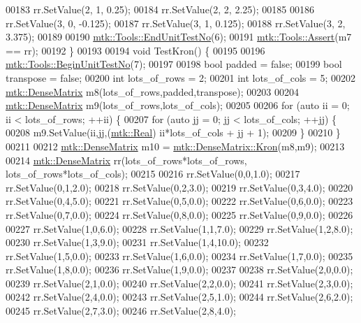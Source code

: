 \begin{DoxyCode}
00183   rr.SetValue(2, 1, 0.25);
00184   rr.SetValue(2, 2, 2.25);
00185 
00186   rr.SetValue(3, 0, -0.125);
00187   rr.SetValue(3, 1, 0.125);
00188   rr.SetValue(3, 2, 3.375);
00189 
00190   \hyperlink{classmtk_1_1Tools_ad8cf0085133dd40c913fe195bc5b9694}{mtk::Tools::EndUnitTestNo}(6);
00191   \hyperlink{classmtk_1_1Tools_aa311fada9255627d06c56b1e4fedce9e}{mtk::Tools::Assert}(m7 == rr);
00192 \}
00193 
00194 \textcolor{keywordtype}{void} TestKron() \{
00195 
00196   \hyperlink{classmtk_1_1Tools_a26ee906d28523378522a75e25c3a4e19}{mtk::Tools::BeginUnitTestNo}(7);
00197 
00198   \textcolor{keywordtype}{bool} padded = \textcolor{keyword}{false};
00199   \textcolor{keywordtype}{bool} transpose = \textcolor{keyword}{false};
00200   \textcolor{keywordtype}{int} lots\_of\_rows = 2;
00201   \textcolor{keywordtype}{int} lots\_of\_cols = 5;
00202   \hyperlink{classmtk_1_1DenseMatrix}{mtk::DenseMatrix} m8(lots\_of\_rows,padded,transpose);
00203 
00204   \hyperlink{classmtk_1_1DenseMatrix}{mtk::DenseMatrix} m9(lots\_of\_rows,lots\_of\_cols);
00205 
00206   \textcolor{keywordflow}{for} (\textcolor{keyword}{auto} ii = 0; ii < lots\_of\_rows; ++ii) \{
00207     \textcolor{keywordflow}{for} (\textcolor{keyword}{auto} jj = 0; jj < lots\_of\_cols; ++jj) \{
00208       m9.SetValue(ii,jj,(\hyperlink{group__c01-roots_gac080bbbf5cbb5502c9f00405f894857d}{mtk::Real}) ii*lots\_of\_cols + jj + 1);
00209     \}
00210   \}
00211 
00212   \hyperlink{classmtk_1_1DenseMatrix}{mtk::DenseMatrix} m10 = \hyperlink{classmtk_1_1DenseMatrix_a01d3d8bd502870f93bf3a88a0cc5fb49}{mtk::DenseMatrix::Kron}(m8,m9);
00213 
00214   \hyperlink{classmtk_1_1DenseMatrix}{mtk::DenseMatrix} rr(lots\_of\_rows*lots\_of\_rows, lots\_of\_rows*lots\_of\_cols);
00215 
00216   rr.SetValue(0,0,1.0);
00217   rr.SetValue(0,1,2.0);
00218   rr.SetValue(0,2,3.0);
00219   rr.SetValue(0,3,4.0);
00220   rr.SetValue(0,4,5.0);
00221   rr.SetValue(0,5,0.0);
00222   rr.SetValue(0,6,0.0);
00223   rr.SetValue(0,7,0.0);
00224   rr.SetValue(0,8,0.0);
00225   rr.SetValue(0,9,0.0);
00226 
00227   rr.SetValue(1,0,6.0);
00228   rr.SetValue(1,1,7.0);
00229   rr.SetValue(1,2,8.0);
00230   rr.SetValue(1,3,9.0);
00231   rr.SetValue(1,4,10.0);
00232   rr.SetValue(1,5,0.0);
00233   rr.SetValue(1,6,0.0);
00234   rr.SetValue(1,7,0.0);
00235   rr.SetValue(1,8,0.0);
00236   rr.SetValue(1,9,0.0);
00237 
00238   rr.SetValue(2,0,0.0);
00239   rr.SetValue(2,1,0.0);
00240   rr.SetValue(2,2,0.0);
00241   rr.SetValue(2,3,0.0);
00242   rr.SetValue(2,4,0.0);
00243   rr.SetValue(2,5,1.0);
00244   rr.SetValue(2,6,2.0);
00245   rr.SetValue(2,7,3.0);
00246   rr.SetValue(2,8,4.0);

\end{DoxyCode}
